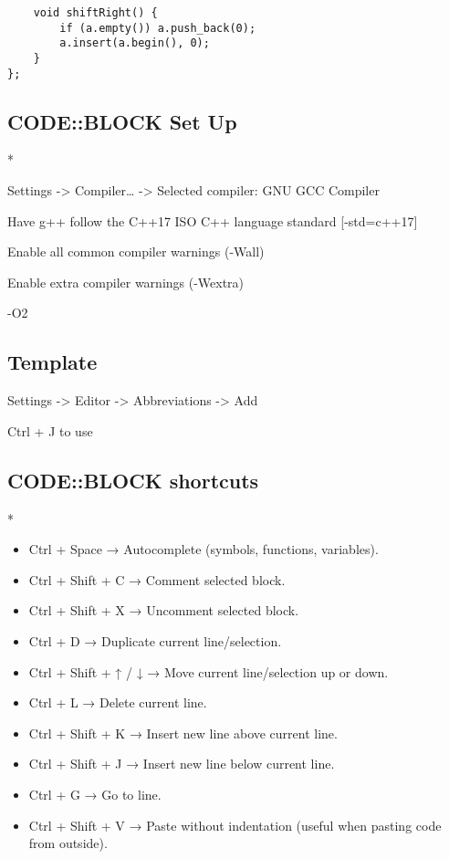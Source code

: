 \documentclass[11pt,a4paper]{article}
\begin{document}
\begin{multicols*}{2}
\begin{lstlisting}
    void shiftRight() {
        if (a.empty()) a.push_back(0);
        a.insert(a.begin(), 0);
    }
};

\end{lstlisting}

\subsection{CODE::BLOCK Set Up}
*

Settings -> Compiler… -> Selected compiler: GNU GCC Compiler

Have g++ follow the C++17 ISO C++ language standard [-std=c++17]

Enable all common compiler warnings (-Wall)

Enable extra compiler warnings (-Wextra)

-O2

\subsection{Template}

Settings -> Editor -> Abbreviations -> Add

Ctrl + J to use

\subsection{CODE::BLOCK shortcuts}
*

\begin{itemize}
    \item Ctrl + Space → Autocomplete (symbols, functions, variables).
    \item Ctrl + Shift + C → Comment selected block.
    \item Ctrl + Shift + X → Uncomment selected block.
    \item Ctrl + D → Duplicate current line/selection.
    \item Ctrl + Shift + ↑ / ↓ → Move current line/selection up or down.
    \item Ctrl + L → Delete current line.
    \item Ctrl + Shift + K → Insert new line above current line.
    \item Ctrl + Shift + J → Insert new line below current line.
    \item Ctrl + G → Go to line.
    \item Ctrl + Shift + V → Paste without indentation (useful when pasting code from outside).
\end{itemize}


\end{multicols*}
\end{document}

